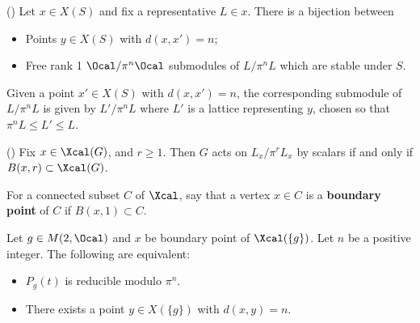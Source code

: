 \begin{lemma}(\cite[Lemma 2.2]{ophirRIBETLEMMAGL22021})
	Let $x \in X(S)$ and fix a representative $L \in x$. There is a bijection between
	\begin{itemize}
		\item Points $y \in X(S)$ with $d(x,x') = n$;
		\item Free rank 1 $\Ocal/ \pi^n \Ocal$ submodules of $L/\pi^n L$ which are stable under $S$.
	\end{itemize}
	Given a point $x' \in X(S)$ with $d(x,x')=n$, the corresponding submodule of $L/\pi^n L$ is given by $L'/\pi^n L$ where $L'$ is a lattice representing $y$, chosen so that $ \pi^n L \leq L' \leq L$.
\end{lemma}

\begin{lemma}(\cite[Lemma 2.6]{ophirRIBETLEMMAGL22021})
	Fix $x\in \Xcal(G)$, and $r\geq 1$. Then $G$ acts on $L_x / \pi^r L_x$ by scalars if and only if $B(x,r) \subset \Xcal(G)$.
\end{lemma}


\begin{definition}
	For a connected subset $C$ of $\Xcal$, say that a vertex $x \in C$ is a \textbf{boundary point} of $C$ if $B(x,1) \subset C$.
\end{definition}



\begin{lemma}\label{lemma:elementwise}
	\cite[Cor. 2.20]{ophirRIBETLEMMAGL22021} Let $g\in M(2,\Ocal)$ and $x$ be boundary point of $\Xcal(\{g\})$. Let $n$ be a positive integer. The following are equivalent:
	\begin{itemize}
		\item $P_g(t)$ is reducible modulo $\pi^n$.
		\item There exists a point $y \in X(\{g\})$ with $d(x,y) = n$.
	\end{itemize}
\end{lemma}




